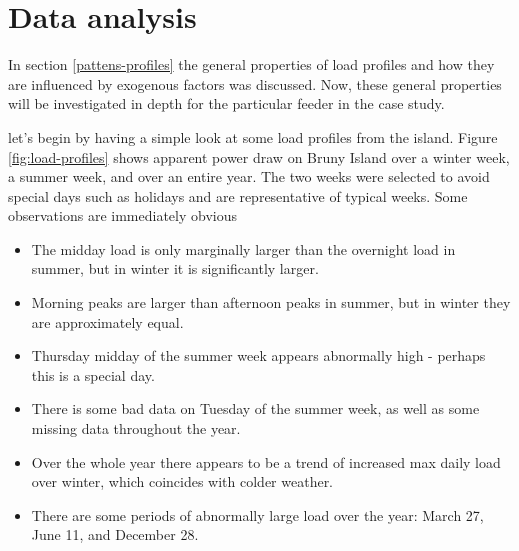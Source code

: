 \section{Data analysis}
In section \ref{pattens-profiles} the general properties of load profiles and how they are influenced by exogenous factors was discussed. Now, these general properties will be investigated in depth for the particular feeder in the case study.
\par
let's begin by having a simple look at some load profiles from the island.
Figure \ref{fig:load-profiles} shows apparent power draw on Bruny Island over a winter week, a summer week, and over an entire year.
The two weeks were selected to avoid special days such as holidays and are representative of typical weeks.
Some observations are immediately obvious
\begin{itemize}
	\item The midday load is only marginally larger than the overnight load in summer, but in winter it is significantly larger.
	\item Morning peaks are larger than afternoon peaks in summer, but in winter they are approximately equal.
	\item Thursday midday of the summer week appears abnormally high - perhaps this is a special day.
	\item There is some bad data on Tuesday of the summer week, as well as some missing data throughout the year.
	\item Over the whole year there appears to be a trend of increased max daily load over winter, which coincides with colder weather.
	\item There are some periods of abnormally large load over the year: March 27, June 11, and December 28.
\end{itemize}

